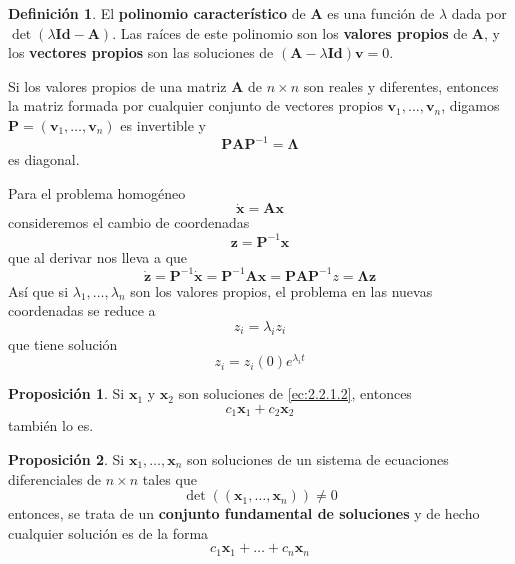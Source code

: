 \documentclass[spanish]{book}
\theoremstyle{definition}
\newtheorem*{defn}{Definición}
\newtheorem*{prop}{Proposición}
\begin{document}
	\begin{defn}El \textbf{polinomio característico} de $\mathbf{A}$ es una función de $\lambda$ dada por $\det(\lambda \mathbf{Id}-\mathbf{A})$. Las raíces de este polinomio son los \textbf{valores propios} de $\mathbf{A}$, y los \textbf{vectores propios} son las soluciones de $(\mathbf{A}-\lambda \mathbf{Id})\mathbf{v}=0$.
	\end{defn}
	\begin{teo}
		Si los valores propios de una matriz $\mathbf{A}$ de $n\times n$ son reales y diferentes, entonces la matriz formada por cualquier conjunto de vectores propios $\mathbf{v}_1,\ldots,\mathbf{v}_n$, digamos $\mathbf{P}=(\mathbf{v}_1,\ldots,\mathbf{v}_n)$ es invertible y
			\[\mathbf{PAP}^{-1}=\mathbf{\Lambda}\]
		es diagonal.
	\end{teo}
	
	Para el problema homogéneo
		\begin{equation}\label{ec:2.2.1.2}
		\dot{\mathbf{x}}=\mathbf{A}\mathbf{x}
	\end{equation}
	consideremos el cambio de coordenadas
	\[\mathbf{z}=\mathbf{P}^{-1}\mathbf{x}\]
	que al derivar nos lleva a que
	\[\dot{\mathbf{z}}=\mathbf{P}^{-1}\dot{\mathbf{x}}=\mathbf{P}^{-1}\mathbf{A}\mathbf{x}=\mathbf{PAP}^{-1}z=\mathbf{\Lambda z}\]
	Así que si $\lambda_1,\ldots,\lambda_n$ son los valores propios, el problema en las nuevas coordenadas se reduce a
	\[z_i=\lambda_i z_i\]
	que tiene solución
	\[z_i=z_i(0)e^{\lambda_it}\]
	
	\begin{prop}\label{prop:2.2.2.1.1}
		Si $\mathbf{x}_1$ y $\mathbf{x}_2$ son soluciones de \eqref{ec:2.2.1.2}, entonces
		\[c_1\mathbf{x}_1+c_2\mathbf{x}_2\]
		también lo es.
	\end{prop}
	\begin{prop}
		Si $\mathbf{x}_1,\ldots,\mathbf{x}_n$ son soluciones de un sistema de ecuaciones diferenciales de $n\times n$ tales que
		\[\det((\mathbf{x}_1,\ldots,\mathbf{x}_n))\neq0\]
		entonces, se trata de un \textbf{conjunto fundamental de soluciones} y de hecho cualquier solución es de la forma
		\[c_1\mathbf{x}_1+\ldots+c_n\mathbf{x}_n\]
	\end{prop}
\newpage
\end{document}
